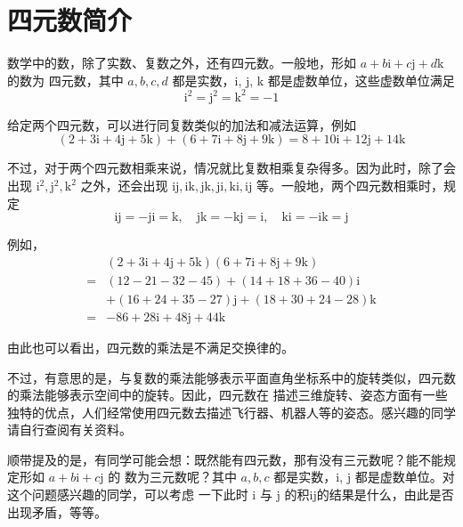 \documentclass[a4paper,openany]{ctexbook}
\begin{document}
\section{四元数简介}

数学中的数，除了实数、复数之外，还有四元数。一般地，形如 \( a + b\mathrm{i} + c\mathrm{j} + d\mathrm{k} \) 的数为
四元数，其中 \( a, b, c, d \) 都是实数，$\mathrm{i}$, $\mathrm{j}$, $\mathrm{k}$ 都是虚数单位，这些虚数单位满足
\[ \mathrm{i}^2 = \mathrm{j}^2 = \mathrm{k}^2 = -1 \]

给定两个四元数，可以进行同复数类似的加法和减法运算，例如
\[ (2 + 3\mathrm{i} + 4\mathrm{j} + 5\mathrm{k}) + (6 + 7\mathrm{i} + 8\mathrm{j} + 9\mathrm{k}) = 8 + 10\mathrm{i} + 12\mathrm{j} + 14\mathrm{k}\]

不过，对于两个四元数相乘来说，情况就比复数相乘复杂得多。因为此时，除了会出现 \( \mathrm{i}^2, \mathrm{j}^2,
\mathrm{k}^2 \) 之外，还会出现 \( \mathrm{i}\mathrm{j}, \mathrm{i}\mathrm{k}, \mathrm{j}\mathrm{k},
\mathrm{j}\mathrm{i}, \mathrm{k}\mathrm{i}, \mathrm{i}\mathrm{j} \) 等。一般地，两个四元数相乘时，规定
\[
    \mathrm{i}\mathrm{j} = -\mathrm{j}\mathrm{i} = \mathrm{k},
    \quad
    \mathrm{j}\mathrm{k} = -\mathrm{k}\mathrm{j} = \mathrm{i},
    \quad
    \mathrm{k}\mathrm{i} = -\mathrm{i}\mathrm{k} = \mathrm{j}
\]

例如，
\begin{align*}
      & (2 + 3\mathrm{i} + 4\mathrm{j} + 5\mathrm{k})(6 + 7\mathrm{i} + 8\mathrm{j} + 9\mathrm{k}) \\
    = & (12 - 21 - 32 - 45) +(14 + 18 + 36 - 40)\mathrm{i}                                         \\
      & +(16 + 24 + 35 - 27)\mathrm{j} +(18 + 30 + 24 - 28)\mathrm{k}                              \\
    = & -86 + 28\mathrm{i} + 48\mathrm{j} + 44\mathrm{k}
\end{align*}

由此也可以看出，四元数的乘法是不满足交换律的。

不过，有意思的是，与复数的乘法能够表示平面直角坐标系中的旋转类似，四元数的乘法能够表示空间中的旋转。因此，四元数在
描述三维旋转、姿态方面有一些独特的优点，人们经常使用四元数去描述飞行器、机器人等的姿态。感兴趣的同学请自行查阅有关资料。

顺带提及的是，有同学可能会想：既然能有四元数，那有没有三元数呢？能不能规定形如 \(a + b\mathrm{i} + c\mathrm{j}\) 的
数为三元数呢？其中 \(a, b, c\) 都是实数，$\mathrm{i}$, $\mathrm{j}$ 都是虚数单位。对这个问题感兴趣的同学，可以考虑
一下此时 $\mathrm{i}$ 与 $\mathrm{j}$ 的积$\mathrm{i}\mathrm{j}$的结果是什么，由此是否出现矛盾，等等。
\end{document}
